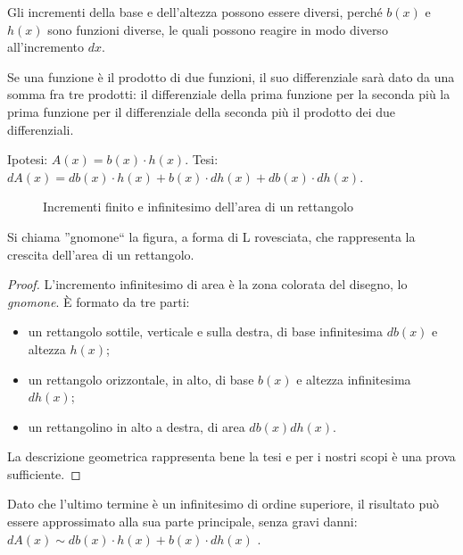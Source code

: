 \begin{osservazione}
Gli incrementi della base e dell'altezza possono essere 
diversi, perché $b(x)$ e $h(x)$ sono funzioni diverse, le quali possono
reagire in modo diverso all'incremento $dx$.
\end{osservazione}

\begin{teorema}
 Se una funzione è il prodotto di due funzioni, il suo  differenziale 
 sarà dato da una somma fra tre prodotti: il differenziale della
 prima funzione per la seconda più la prima funzione per il differenziale 
 della seconda più il prodotto dei due differenziali.
\end{teorema}
\noindent Ipotesi: $\mathit{A}(x)=b(x)\cdot h(x)$.\qquad 
Tesi: $d\mathit{A}(x)=db(x)\cdot h(x)+b(x)\cdot dh(x)+ db(x)\cdot dh(x)$.

\begin{figure}[h]
\begin{inaccessibleblock}
 \begin{center}
 \begin{minipage}[]{.38 \textwidth}
  \vspace{27mm} \incrementaleprodotto
 \end{minipage} 
 \hfill
 \begin{minipage}[]{.58 \textwidth}
  \differenzialeprodotto
 \end{minipage}
 \end{center}
\end{inaccessibleblock}
\caption{Incrementi finito e infinitesimo dell'area di un rettangolo} 
\label{fig:Incre_prodotto}
\end{figure}

\begin{osservazione}
 Si chiama ''gnomone`` la figura, a forma di L rovesciata, che rappresenta 
la 
crescita dell'area di un rettangolo.
\end{osservazione}

\begin{proof}
L'incremento infinitesimo di area è la zona colorata del disegno, lo 
\emph{gnomone}. È formato da tre parti:
\begin{itemize} [noitemsep]
 \item un rettangolo sottile, verticale e sulla destra, di base
 infinitesima $db(x)$ e altezza $h(x)$;
 \item un rettangolo orizzontale, in alto, di base $b(x)$ e
 altezza infinitesima $dh(x)$;
 \item un rettangolino in alto a destra, di area $db(x) dh(x)$.
\end{itemize}
La descrizione geometrica rappresenta bene la tesi e per i nostri scopi è
una prova sufficiente. 
\end{proof}
Dato che l'ultimo termine è un infinitesimo di ordine
superiore, il risultato può essere approssimato alla sua parte principale, 
senza gravi danni: $d\mathit{A}(x)\sim db(x)\cdot h(x)+b(x)\cdot dh(x)$ .


